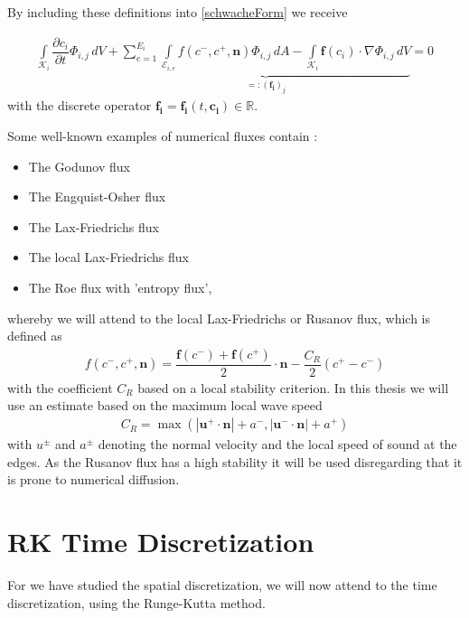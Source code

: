 		By including these definitions into \eqref{schwacheForm} we receive
		
		\begin{align}
			\int\limits_{\mathcal{K}_i} \dfrac{\partial c_i}{\partial t}\Phi_{i,j} \, dV +
			\underbrace{\sum_{e=1}^{E_i}\int\limits_{\mathcal{E}_{i,e}} f \left( c^-, c^+, \mathbf{n} \right) \Phi_{i,j} \, dA - \int\limits_{\mathcal{K}_i} \boldsymbol{f}\left(c_i\right) \cdot \nabla\Phi_{i,j} \, dV}_{=:(\mathbf{f_i})_j} = 0
			\label{schwacheFormFlux}
		\end{align}
		with the discrete operator $\mathbf{f_i}=\mathbf{f_i}(t, \mathbf{c_i})\in\mathbb{R}$.
		
		Some well-known examples of numerical fluxes contain \cite{Cockburn1998}:
		\begin{itemize}
			\item The Godunov flux 
			\item The Engquist-Osher flux
			\item The Lax-Friedrichs flux
			\item The local Lax-Friedrichs flux
			\item The Roe flux with 'entropy flux',
		\end{itemize}
		whereby we will attend to the local Lax-Friedrichs or Rusanov flux, which is defined as
		\begin{align}
			f(c^-, c^+, \mathbf{n}) = \dfrac{\mathbf{f}(c^-)+\mathbf{f}(c^+)}{2} \cdot \mathbf{n} -\dfrac{C_R}{2}(c^+-c^-)
		\end{align}
		with the coefficient $C_R$ based on a local stability criterion. In this thesis we will use an estimate based on the maximum local wave speed
		\begin{align}
			C_R = \max(|\mathbf{u^+}\cdot \mathbf{n}|+a^-,|\mathbf{u^-}\cdot \mathbf{n}|+a^+)
		\end{align}
		with $u^\pm$ and $a^\pm$ denoting the normal velocity and the local speed of sound at the edges.
		As the Rusanov flux has a high stability it will be used disregarding that it is prone to numerical diffusion.
		
	\section{RK Time Discretization}
	For we have studied the spatial discretization, we will now attend to the time discretization, using the Runge-Kutta method.\\\\

